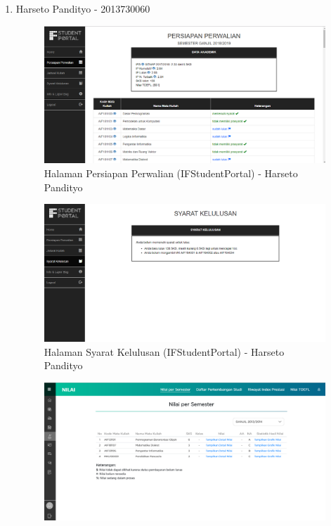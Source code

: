 \begin{itemize}
\begin{enumerate}
		\item Harseto Pandityo - 2013730060 \\
		\begin{figure}[H]
			\centering
			\includegraphics[scale=0.45]{Gambar/HasilPengujian/2013_2_persiapan_perwalian_ifstudentportal}
			\caption{Halaman Persiapan Perwalian (IFStudentPortal) - Harseto Pandityo}
			\label{fig:2013_2_persiapan_perwalian_ifstudentportal}
		\end{figure}
		\begin{figure}[H]
			\centering
			\includegraphics[scale=0.45]{Gambar/HasilPengujian/2013_2_syarat_kelulusan_ifstudentportal}
			\caption{Halaman Syarat Kelulusan (IFStudentPortal) - Harseto Pandityo}
			\label{fig:2013_2_syarat_kelulusan_ifstudentportal}
		\end{figure}
		\begin{figure}[H]
			\centering
			\includegraphics[scale=0.45]{Gambar/HasilPengujian/2013_2_nps_studentportal}

\end{figure}
\end{enumerate}
\end{itemize}
